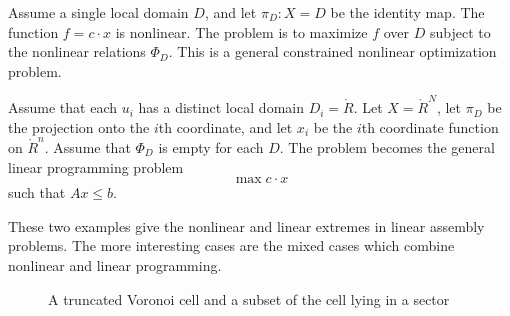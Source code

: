 \begin{example}
Assume a single local domain $D$, and let $\pi_D:X=D$ be the
identity map.  The function $f = c\cdot x $ is nonlinear. The
problem is to maximize $f$ over $D$ subject to the nonlinear
relations $\Phi_D$.  This is a general constrained nonlinear
optimization problem.
\end{example}

\begin{example}  Assume that each $u_i$ has a distinct local domain $D_i = \ring{R}$.
Let $X = \ring{R}^N$, let $\pi_D$ be the projection onto the $i$th
coordinate, and let $x_i$ be the $i$th coordinate function on
$\ring{R}^n$. Assume that $\Phi_D$ is empty for each $D$.  The
problem becomes the general linear programming problem
    $$\max c\cdot x$$
such that $A x\le b$.
\end{example}

These two examples give the nonlinear and linear extremes in
linear assembly problems. The more interesting cases are the mixed
cases which combine nonlinear and linear programming.

\begin{figure}[htb]
  \centering
  \caption{A truncated Voronoi cell and a subset of the cell lying in a sector}
  \label{voronoi}
\end{figure}


